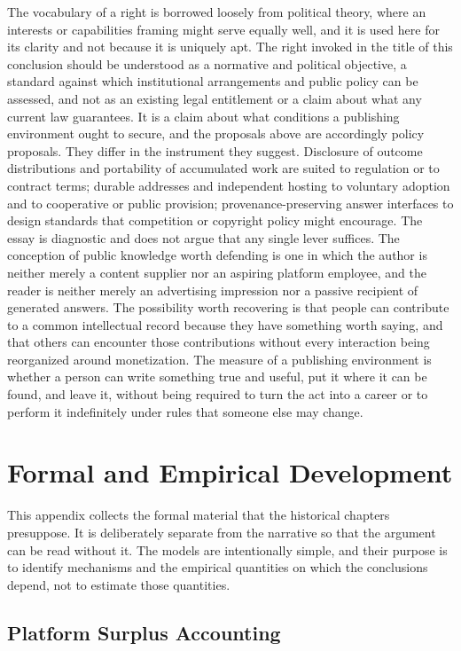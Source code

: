 \documentclass[11pt]{article}
\theoremstyle{remark}
\begin{document}
The vocabulary of a right is borrowed loosely from political theory, where an interests or capabilities framing might serve equally well, and it is used here for its clarity and not because it is uniquely apt. The right invoked in the title of this conclusion should be understood as a normative and political objective, a standard against which institutional arrangements and public policy can be assessed, and not as an existing legal entitlement or a claim about what any current law guarantees. It is a claim about what conditions a publishing environment ought to secure, and the proposals above are accordingly policy proposals. They differ in the instrument they suggest. Disclosure of outcome distributions and portability of accumulated work are suited to regulation or to contract terms; durable addresses and independent hosting to voluntary adoption and to cooperative or public provision; provenance-preserving answer interfaces to design standards that competition or copyright policy might encourage. The essay is diagnostic and does not argue that any single lever suffices. The conception of public knowledge worth defending is one in which the author is neither merely a content supplier nor an aspiring platform employee, and the reader is neither merely an advertising impression nor a passive recipient of generated answers. The possibility worth recovering is that people can contribute to a common intellectual record because they have something worth saying, and that others can encounter those contributions without every interaction being reorganized around monetization. The measure of a publishing environment is whether a person can write something true and useful, put it where it can be found, and leave it, without being required to turn the act into a career or to perform it indefinitely under rules that someone else may change.

\appendix
\section{Formal and Empirical Development}

This appendix collects the formal material that the historical chapters presuppose. It is deliberately separate from the narrative so that the argument can be read without it. The models are intentionally simple, and their purpose is to identify mechanisms and the empirical quantities on which the conclusions depend, not to estimate those quantities.

\subsection{Platform Surplus Accounting}
\end{document}
